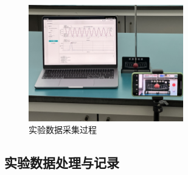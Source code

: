 \begin{figure}[H]
    \centering
    \includegraphics[width=0.6\textwidth]{figures/实验画面.JPG}
    \caption{实验数据采集过程}
    \label{fig:experiment_process}
\end{figure}

\subsection{实验数据处理与记录}

